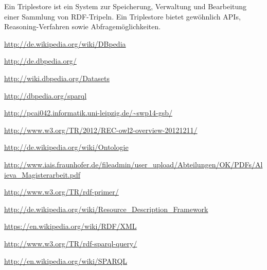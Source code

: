 {Ein Triplestore ist ein System zur Speicherung, Verwaltung und Bearbeitung einer
 Sammlung von RDF-Tripeln. Ein Triplestore bietet gewöhnlich APIs,
 Rea\-so\-ning-Verfahren sowie Abfragemöglichkeiten. \cite{fraunhofer}}
\newpage
\begin{thebibliography}{99}
  \url{http://de.wikipedia.org/wiki/DBpedia}

  \url{http://de.dbpedia.org/}

  \url{http://wiki.dbpedia.org/Datasets}

  \url{http://dbpedia.org/sparql}

  \url{http://pcai042.informatik.uni-leipzig.de/~swp14-gsb/}

  \url{http://www.w3.org/TR/2012/REC-owl2-overview-20121211/}

  \url{http://de.wikipedia.org/wiki/Ontologie}

  \url{http://www.iais.fraunhofer.de/fileadmin/user_upload/Abteilungen/OK/PDFs/Alieva_Magisterarbeit.pdf}

  \url{http://www.w3.org/TR/rdf-primer/}

  \url{http://de.wikipedia.org/wiki/Resource_Description_Framework}

  \url{https://en.wikipedia.org/wiki/RDF/XML}

  \url{http://www.w3.org/TR/rdf-sparql-query/}

  \url{http://en.wikipedia.org/wiki/SPARQL}

\end{thebibliography}


